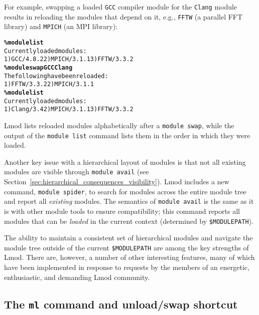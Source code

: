 For example, swapping a loaded \texttt{\small GCC} compiler module for the
\texttt{\small {Clang}} module results in reloading the modules that
depend on it, e.g., \texttt{\small FFTW} (a parallel FFT library) and
\texttt{\small MPICH} (an MPI library):
{\small
  \begin{alltt}
    \textbf{\% module list}
    Currently loaded modules:
    1) GCC/4.8.2  2) MPICH/3.1.1  3) FFTW/3.3.2
    \textbf{\% module swap GCC Clang}
    The following have been reloaded:
    1) FFTW/3.3.2  2) MPICH/3.1.1
    \textbf{\% module list}
    Currently loaded modules:
    1) Clang/3.4  2) MPICH/3.1.1  3) FFTW/3.3.2
\end{alltt}
}
\noindent
Lmod lists reloaded modules
alphabetically after a \texttt{\small module swap}, while the output of
the \texttt{\small module list} command lists them in the order in which
they were loaded.

Another key issue with a hierarchical layout of modules is that not all
existing modules are visible through \texttt{\small module avail} (see
Section~\ref{sec:hierarchical_consequences_visibility}). Lmod includes a
new command, \texttt{\small module spider}, to search for modules across the
entire module tree and report all \emph{existing} modules. The semantics of
\texttt{\small module avail} is the same as it is with other module tools to ensure
compatibility; this command reports all modules that can be \emph{loaded} in the
current context (determined by \texttt{\small \$MODULEPATH}).

The ability to maintain a consistent set of hierarchical modules and navigate the
module tree outside of the current \texttt{\small \$MODULEPATH} are among the key
strengths of Lmod. There are, however, a number of other interesting features, many
of which have been implemented in response to requests by the members of an
energetic, enthusiastic, and demanding Lmod community. 

\subsection{The \texttt{\small ml} command and unload/swap shortcut}


